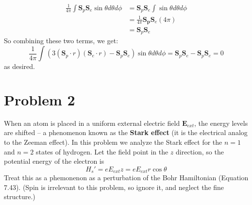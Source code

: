 \documentclass[10pt]{article}
\begin{document}
\begin{solution}
		\begin{align*}
			\frac{1}{4\pi} \int \mathbf S_p \mathbf S_e \sin \theta d\theta d\phi &= \mathbf S_p \mathbf S_e \int \sin \theta d\theta d\phi\\
			&= \frac{1}{4\pi} \mathbf{S_p}{\mathbf S_e} (4\pi)\\
			&= \mathbf S_p \mathbf S_e
		\end{align*}
		So combining these two terms, we get: 
		\[ \frac{1}{4\pi} \int \left( 3(\mathbf S_p \cdot r)(\mathbf S_e \cdot r) - \mathbf S_p \mathbf S_e\right) \sin \theta d\theta d\phi = \mathbf S_p \mathbf S_e - \mathbf S_p \mathbf S_e = 0\] 
		as desired.
	\end{solution}

	\pagebreak

	\section*{Problem 2}
	When an atom is placed in a uniform external electric field $\mathbf E_{ext}$, the energy levels are shifted -- a phenomenon known as the \textbf{Stark effect} (it is the electrical analog to the Zeeman effect). In this problem we analyze the Stark effect for the $n=1$ and $n=2$ states of hydrogen. Let the field point in the $z$ direction, so the potential energy of the electron is
	\[ H_s' = eE_{ext} z = eE_{ext} r \cos \theta\]
	Treat this as a phemonenon as a perturbation of the Bohr Hamiltonian (Equation 7.43). (Spin is irrelevant to this problem, so ignore it, and neglect the fine structure.)
\end{document}
